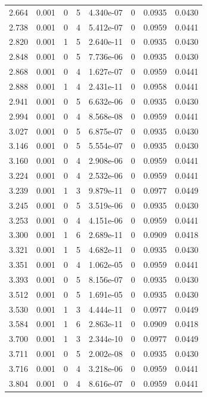 \documentclass[preview]{standalone}
\begin{document}
{{{\begin{tabular}{L{1.2cm}C{1.2cm} C{0.3cm}C{0.5cm} C{1.4cm}C{1.4cm} C{1.4cm}C{1.4cm}}
  2.664  &  0.001  & 0     &  5 &  4.340e-07  & 0  & 0.0935 &  0.0430   \\ 
  2.738  &  0.001  & 0     &  4 &  5.412e-07  & 0  & 0.0959 &  0.0441   \\ 
  2.820  &  0.001  & 1     &  5 &  2.640e-11  & 0  & 0.0935 &  0.0430   \\ 
  2.848  &  0.001  & 0     &  5 &  7.736e-06  & 0  & 0.0935 &  0.0430   \\ 
  2.868  &  0.001  & 0     &  4 &  1.627e-07  & 0  & 0.0959 &  0.0441   \\ 
  2.888  &  0.001  & 1     &  4 &  2.431e-11  & 0  & 0.0958 &  0.0441   \\ 
  2.941  &  0.001  & 0     &  5 &  6.632e-06  & 0  & 0.0935 &  0.0430   \\ 
  2.994  &  0.001  & 0     &  4 &  8.568e-08  & 0  & 0.0959 &  0.0441   \\ 
  3.027  &  0.001  & 0     &  5 &  6.875e-07  & 0  & 0.0935 &  0.0430   \\ 
  3.146  &  0.001  & 0     &  5 &  5.554e-07  & 0  & 0.0935 &  0.0430   \\ 
  3.160  &  0.001  & 0     &  4 &  2.908e-06  & 0  & 0.0959 &  0.0441   \\ 
  3.224  &  0.001  & 0     &  4 &  2.532e-06  & 0  & 0.0959 &  0.0441   \\ 
  3.239  &  0.001  & 1     &  3 &  9.879e-11  & 0  & 0.0977 &  0.0449   \\ 
  3.245  &  0.001  & 0     &  5 &  3.519e-06  & 0  & 0.0935 &  0.0430   \\ 
  3.253  &  0.001  & 0     &  4 &  4.151e-06  & 0  & 0.0959 &  0.0441   \\ 
  3.300  &  0.001  & 1     &  6 &  2.689e-11  & 0  & 0.0909 &  0.0418   \\ 
  3.321  &  0.001  & 1     &  5 &  4.682e-11  & 0  & 0.0935 &  0.0430   \\ 
  3.351  &  0.001  & 0     &  4 &  1.062e-05  & 0  & 0.0959 &  0.0441   \\ 
  3.393  &  0.001  & 0     &  5 &  8.156e-07  & 0  & 0.0935 &  0.0430   \\ 
  3.512  &  0.001  & 0     &  5 &  1.691e-05  & 0  & 0.0935 &  0.0430   \\ 
  3.530  &  0.001  & 1     &  3 &  4.444e-11  & 0  & 0.0977 &  0.0449   \\ 
  3.584  &  0.001  & 1     &  6 &  2.863e-11  & 0  & 0.0909 &  0.0418   \\ 
  3.700  &  0.001  & 1     &  3 &  2.344e-10  & 0  & 0.0977 &  0.0449   \\ 
  3.711  &  0.001  & 0     &  5 &  2.002e-08  & 0  & 0.0935 &  0.0430   \\ 
  3.716  &  0.001  & 0     &  4 &  3.218e-06  & 0  & 0.0959 &  0.0441   \\ 
  3.804  &  0.001  & 0     &  4 &  8.616e-07  & 0  & 0.0959 &  0.0441   \\ 
\hline 
\end{tabular} 

}}}
\end{document}

